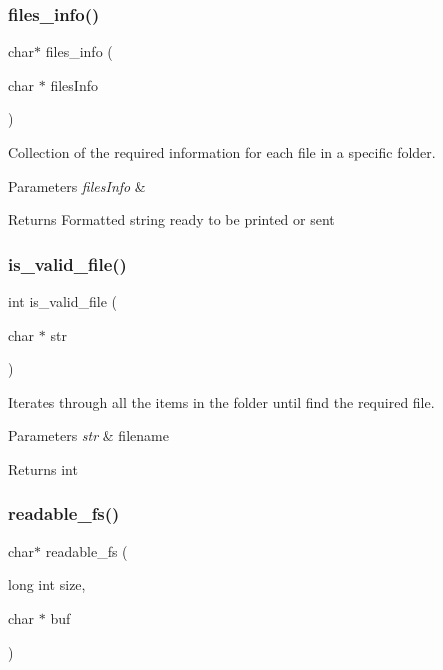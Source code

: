 \subsubsection{files\+\_\+info()}
{\footnotesize\ttfamily char$\ast$ files\+\_\+info (\begin{DoxyParamCaption}\item[{char $\ast$}]{files\+Info }\end{DoxyParamCaption})}



Collection of the required information for each file in a specific folder. 


\begin{DoxyParams}{Parameters}
{\em files\+Info} & \\
\hline
\end{DoxyParams}
\begin{DoxyReturn}{Returns}
Formatted string ready to be printed or sent 
\end{DoxyReturn}
\mbox{\label{fileserv_8h_ae4881ba8b98bb6338ccb68559be18c9a}} 
\subsubsection{is\+\_\+valid\+\_\+file()}
{\footnotesize\ttfamily int is\+\_\+valid\+\_\+file (\begin{DoxyParamCaption}\item[{char $\ast$}]{str }\end{DoxyParamCaption})}



Iterates through all the items in the folder until find the required file. 


\begin{DoxyParams}{Parameters}
{\em str} & filename \\
\hline
\end{DoxyParams}
\begin{DoxyReturn}{Returns}
int 
\end{DoxyReturn}
\mbox{\label{fileserv_8h_aaa60420f4ed2522f7e58eedb72afea48}} 
\subsubsection{readable\+\_\+fs()}
{\footnotesize\ttfamily char$\ast$ readable\+\_\+fs (\begin{DoxyParamCaption}\item[{long int}]{size,  }\item[{char $\ast$}]{buf }\end{DoxyParamCaption})}



